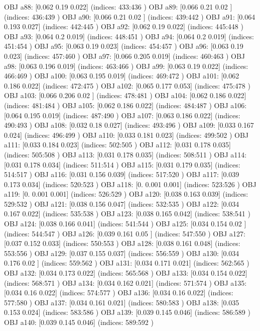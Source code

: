 OBJ a88: [0.062 0.19  0.022] (indices: 433:436 )
OBJ a89: [0.066 0.21  0.02 ] (indices: 436:439 )
OBJ a90: [0.066 0.21  0.02 ] (indices: 439:442 )
OBJ a91: [0.064 0.193 0.027] (indices: 442:445 )
OBJ a92: [0.062 0.19  0.022] (indices: 445:448 )
OBJ a93: [0.064 0.2   0.019] (indices: 448:451 )
OBJ a94: [0.064 0.2   0.019] (indices: 451:454 )
OBJ a95: [0.063 0.19  0.023] (indices: 454:457 )
OBJ a96: [0.063 0.19  0.023] (indices: 457:460 )
OBJ a97: [0.066 0.205 0.019] (indices: 460:463 )
OBJ a98: [0.063 0.196 0.019] (indices: 463:466 )
OBJ a99: [0.063 0.19  0.022] (indices: 466:469 )
OBJ a100: [0.063 0.195 0.019] (indices: 469:472 )
OBJ a101: [0.062 0.186 0.022] (indices: 472:475 )
OBJ a102: [0.065 0.177 0.053] (indices: 475:478 )
OBJ a103: [0.066 0.206 0.02 ] (indices: 478:481 )
OBJ a104: [0.062 0.186 0.022] (indices: 481:484 )
OBJ a105: [0.062 0.186 0.022] (indices: 484:487 )
OBJ a106: [0.064 0.195 0.019] (indices: 487:490 )
OBJ a107: [0.063 0.186 0.022] (indices: 490:493 )
OBJ a108: [0.032 0.18  0.027] (indices: 493:496 )
OBJ a109: [0.033 0.167 0.024] (indices: 496:499 )
OBJ a110: [0.033 0.181 0.023] (indices: 499:502 )
OBJ a111: [0.033 0.184 0.023] (indices: 502:505 )
OBJ a112: [0.031 0.178 0.035] (indices: 505:508 )
OBJ a113: [0.031 0.178 0.035] (indices: 508:511 )
OBJ a114: [0.031 0.178 0.034] (indices: 511:514 )
OBJ a115: [0.031 0.179 0.035] (indices: 514:517 )
OBJ a116: [0.031 0.156 0.039] (indices: 517:520 )
OBJ a117: [0.039 0.173 0.034] (indices: 520:523 )
OBJ a118: [0.    0.001 0.001] (indices: 523:526 )
OBJ a119: [0.    0.001 0.001] (indices: 526:529 )
OBJ a120: [0.038 0.163 0.039] (indices: 529:532 )
OBJ a121: [0.038 0.156 0.047] (indices: 532:535 )
OBJ a122: [0.034 0.167 0.022] (indices: 535:538 )
OBJ a123: [0.038 0.165 0.042] (indices: 538:541 )
OBJ a124: [0.038 0.166 0.041] (indices: 541:544 )
OBJ a125: [0.034 0.154 0.02 ] (indices: 544:547 )
OBJ a126: [0.039 0.161 0.05 ] (indices: 547:550 )
OBJ a127: [0.037 0.152 0.033] (indices: 550:553 )
OBJ a128: [0.038 0.161 0.048] (indices: 553:556 )
OBJ a129: [0.037 0.155 0.037] (indices: 556:559 )
OBJ a130: [0.034 0.176 0.02 ] (indices: 559:562 )
OBJ a131: [0.034 0.171 0.021] (indices: 562:565 )
OBJ a132: [0.034 0.173 0.022] (indices: 565:568 )
OBJ a133: [0.034 0.154 0.022] (indices: 568:571 )
OBJ a134: [0.034 0.162 0.021] (indices: 571:574 )
OBJ a135: [0.034 0.16  0.022] (indices: 574:577 )
OBJ a136: [0.034 0.16  0.022] (indices: 577:580 )
OBJ a137: [0.034 0.161 0.021] (indices: 580:583 )
OBJ a138: [0.035 0.153 0.024] (indices: 583:586 )
OBJ a139: [0.039 0.145 0.046] (indices: 586:589 )
OBJ a140: [0.039 0.145 0.046] (indices: 589:592 )
